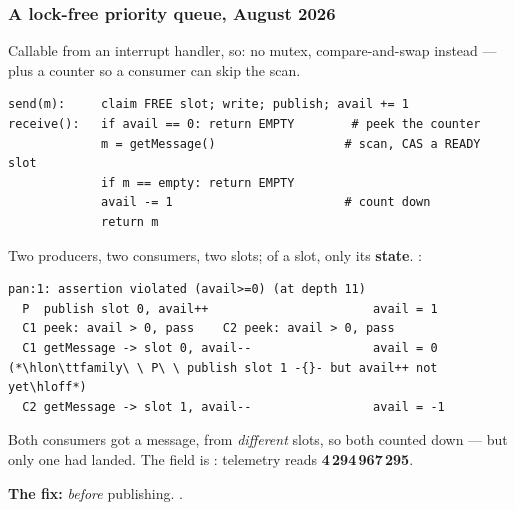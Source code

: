 \begin{frame}[fragile]
  \frametitle{A lock-free priority queue, August 2026} \small

Callable from an interrupt handler, so: no mutex, compare-and-swap instead --- plus a
counter  so a consumer can skip the scan.

\begin{lstlisting}[style=shell]
send(m):     claim FREE slot; write; publish; avail += 1
receive():   if avail == 0: return EMPTY        # peek the counter
             m = getMessage()                  # scan, CAS a READY slot
             if m == empty: return EMPTY
             avail -= 1                        # count down
             return m
\end{lstlisting}

\pause

Two producers, two consumers, two slots; of a slot, only its {\bf state}. \spin{}:

\begin{lstlisting}[style=shellhl]
pan:1: assertion violated (avail>=0) (at depth 11)
  P  publish slot 0, avail++                       avail = 1
  C1 peek: avail > 0, pass    C2 peek: avail > 0, pass
  C1 getMessage -> slot 0, avail--                 avail = 0
(*\hlon\ttfamily\ \ P\ \ publish slot 1 -{}- but avail++ not yet\hloff*)
  C2 getMessage -> slot 1, avail--                 avail = -1
\end{lstlisting}

Both consumers got a message, from {\em different} slots, so both counted down ---
but only one  had landed. The field is : telemetry reads
{\bf 4\,294\,967\,295}.

\pause

{\bf The fix:}  {\em before} publishing. .

\end{frame}
